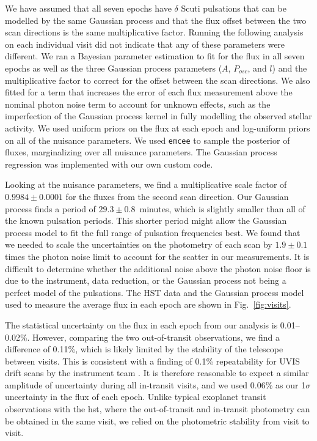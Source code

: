 \documentclass[longauth]{aa} %
\begin{document}
We have assumed that all seven epochs have $\delta$ Scuti pulsations that can be modelled by the same Gaussian process and that the flux offset between the two scan directions is the same multiplicative factor.
%
Running the following analysis on each individual visit did not indicate that any of these parameters were different.
%
We ran a Bayesian parameter estimation to fit for the flux in all seven epochs as well as the three Gaussian process parameters ($A$, $P_{osc}$, and $l$) and the multiplicative factor to correct for the offset between the scan directions.
%
We also fitted for a term that increases the error of each flux measurement above the nominal photon noise term to account for unknown effects, such as the imperfection of the Gaussian process kernel in fully modelling the observed stellar activity.
%
We used uniform priors on the flux at each epoch and log-uniform priors on all of the nuisance parameters.
%
We used \texttt{emcee} \citep{ForemanMackey13} to sample the posterior of fluxes, marginalizing over all nuisance parameters.
%
The Gaussian process regression was implemented with our own custom code.

Looking at the nuisance parameters, we find a multiplicative scale factor of $0.9984 \pm 0.0001$ for the fluxes from the second scan direction.
%
Our Gaussian process finds a period of $29.3 \pm 0.8$~minutes, which is slightly smaller than all of the known pulsation periods.
%
This shorter period might allow the Gaussian process model to fit the full range of pulsation frequencies best.
%
We found that we needed to scale the uncertainties on the photometry of each scan by $1.9 \pm 0.1$ times the photon noise limit to account for the scatter in our measurements.
%
It is difficult to determine whether the additional noise above the photon noise floor is due to the instrument, data reduction, or the Gaussian process not being a perfect model of the pulsations.
%
The HST data and the Gaussian process model used to measure the average flux in each epoch are shown in Fig.~\ref{fig:visits}.

The statistical uncertainty on the flux in each epoch from our analysis is 0.01--0.02\%.
%
However, comparing the two out-of-transit observations, we find a difference of 0.11\%, which is likely limited by the stability of the telescope between visits.
%
This is consistent with a finding of 0.1\%  repeatability for UVIS drift scans by the instrument team \citep[Instrument Science Report WFC3 2017-21;][]{Shanahan2019}.
%
It is therefore reasonable to expect a similar amplitude of uncertainty during all in-transit visits, and we used 0.06\% as our 1$\sigma$ uncertainty in the flux of each epoch.
%
Unlike typical exoplanet transit observations with the \ac{hst}, where the out-of-transit and in-transit photometry can be obtained in the same visit, we relied on the photometric stability from visit to visit.
\end{document}
